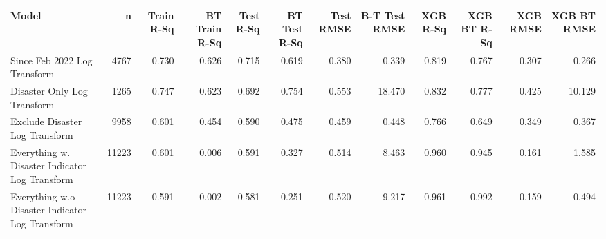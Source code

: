 
\begin{tabular}{l|r|r|r|r|r|r|r|r|r|r|r}
\hline
Model & n & Train R-Sq & BT Train R-Sq & Test R-Sq & BT Test R-Sq & Test RMSE & B-T Test RMSE & XGB R-Sq & XGB BT R-Sq & XGB RMSE & XGB BT RMSE\\
\hline
Since Feb 2022 Log Transform & 4767 & 0.730 & 0.626 & 0.715 & 0.619 & 0.380 & 0.339 & 0.819 & 0.767 & 0.307 & 0.266\\
\hline
Disaster Only Log Transform & 1265 & 0.747 & 0.623 & 0.692 & 0.754 & 0.553 & 18.470 & 0.832 & 0.777 & 0.425 & 10.129\\
\hline
Exclude Disaster Log Transform & 9958 & 0.601 & 0.454 & 0.590 & 0.475 & 0.459 & 0.448 & 0.766 & 0.649 & 0.349 & 0.367\\
\hline
Everything w. Disaster Indicator Log Transform & 11223 & 0.601 & 0.006 & 0.591 & 0.327 & 0.514 & 8.463 & 0.960 & 0.945 & 0.161 & 1.585\\
\hline
Everything w.o Disaster Indicator Log Transform & 11223 & 0.591 & 0.002 & 0.581 & 0.251 & 0.520 & 9.217 & 0.961 & 0.992 & 0.159 & 0.494\\
\hline
\end{tabular}
